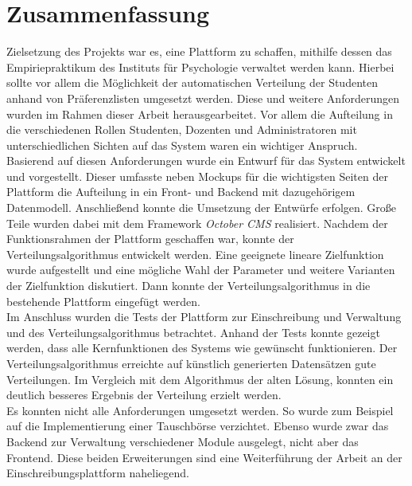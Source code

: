 \chapter{Zusammenfassung}
\label{chapter:summary}
    Zielsetzung des Projekts war es, eine Plattform zu schaffen, mithilfe dessen das Empiriepraktikum des Instituts für Psychologie verwaltet werden kann.
    Hierbei sollte vor allem die Möglichkeit der automatischen Verteilung der Studenten anhand von Präferenzlisten umgesetzt werden.
    Diese und weitere Anforderungen wurden im Rahmen dieser Arbeit herausgearbeitet.
    Vor allem die Aufteilung in die verschiedenen Rollen Studenten, Dozenten und Administratoren mit unterschiedlichen Sichten auf das System waren ein wichtiger Anspruch.
    Basierend auf diesen Anforderungen wurde ein Entwurf für das System entwickelt und vorgestellt.
    Dieser umfasste neben Mockups für die wichtigsten Seiten der Plattform die Aufteilung in ein Front- und Backend mit dazugehörigem Datenmodell.
    Anschließend konnte die Umsetzung der Entwürfe erfolgen.
    Große Teile wurden dabei mit dem Framework \textit{October CMS} realisiert.
    Nachdem der Funktionsrahmen der Plattform geschaffen war, konnte der Verteilungsalgorithmus entwickelt werden.
    Eine geeignete lineare Zielfunktion wurde aufgestellt und eine mögliche Wahl der Parameter und weitere Varianten der Zielfunktion diskutiert.
    Dann konnte der Verteilungsalgorithmus in die bestehende Plattform eingefügt werden.\\
    
    Im Anschluss wurden die Tests der Plattform zur Einschreibung und Verwaltung und des Verteilungsalgorithmus betrachtet.
    Anhand der Tests konnte gezeigt werden, dass alle Kernfunktionen des Systems wie gewünscht funktionieren.
    Der Verteilungsalgorithmus erreichte auf künstlich generierten Datensätzen gute Verteilungen.
    Im Vergleich mit dem Algorithmus der alten Lösung, konnten ein deutlich besseres Ergebnis der Verteilung erzielt werden.\\
    
    Es konnten nicht alle Anforderungen umgesetzt werden.
    So wurde zum Beispiel auf die Implementierung einer Tauschbörse verzichtet.
    Ebenso wurde zwar das Backend zur Verwaltung verschiedener Module ausgelegt, nicht aber das Frontend.
    Diese beiden Erweiterungen sind eine Weiterführung der Arbeit an der Einschreibungsplattform naheliegend.\\
    
    




        
    
